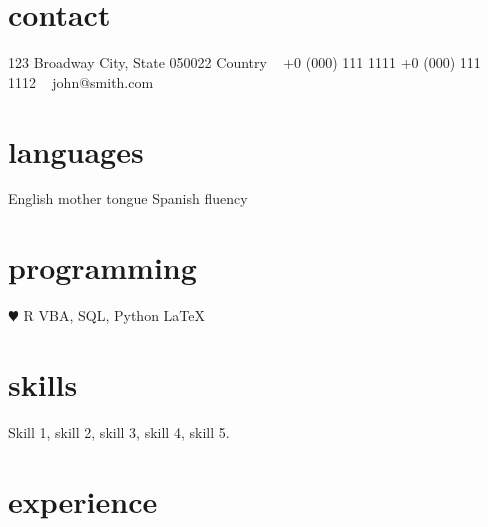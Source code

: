 \documentclass[]{cv-style}          %
\begin{document}
	
	\lastupdated
	
	
	\begin{aside}
		\section{contact}
		123 Broadway
		City, State 050022
		Country
		~
		+0 (000) 111 1111
		+0 (000) 111 1112
		~
		john@smith.com
		\section{languages}
		English mother tongue
		Spanish fluency
		\section{programming}
		{\color{red} $\varheartsuit$} R
		VBA, SQL, Python
		\LaTeX{}
	\end{aside}
	
	
	\section{skills}
	\vspace{-0.2cm}
	
	Skill 1, skill 2, skill 3, skill 4, skill 5.
	
	
	\section{experience}
	
\end{document}
